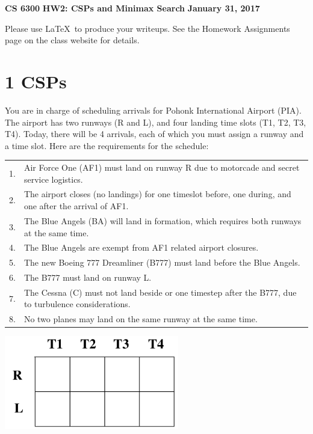 \documentclass[12pt]{article}
\begin{document}
\begin{center}
{\bf CS 6300} \hfill {\large\bf HW2: CSPs and Minimax Search} \hfill {\bf January 31, 2017}
\end{center}

Please use \LaTeX\ to produce your writeups. See the Homework
Assignments page on the class website for details.

\section*{1 CSPs}

You are in charge of scheduling arrivals for Pohonk International
Airport (PIA).  The airport has two runways (R and L), and four landing time
slots (T1, T2, T3, T4).  Today, there will be 4 arrivals, each of
which you must assign a runway and a time slot.  Here are the
requirements for the schedule:

{\small

\begin{center}\begin{tabular}{ll}
1. & Air Force One (AF1) must land on runway R due to motorcade and secret service logistics. \\
2. & The airport closes (no landings) for one timeslot before, one during, and one after the arrival of AF1. \\
3. & The Blue Angels (BA) will land in formation, which requires both runways at the same time. \\
4. & The Blue Angels are exempt from AF1 related airport closures. \\
5. & The new Boeing 777 Dreamliner (B777) must land before the Blue Angels. \\
6. & The B777 must land on runway L. \\
7. & The Cessna (C) must not land beside or one timestep after the B777, due to turbulence considerations. \\
8. & No two planes may land on the same runway at the same time. 
\end{tabular}\end{center}

}

\begin{center}
\includegraphics[width=3in]{airport.png}
\end{center}
\end{document}

